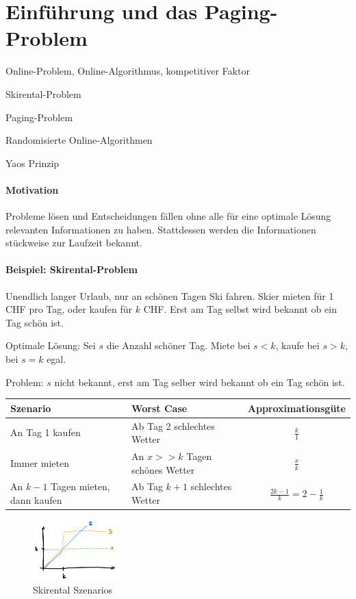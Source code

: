 \section{Einführung und das Paging-Problem}

\begin{takeaway}
    \item Online-Problem, Online-Algorithmus, kompetitiver Faktor
    \item Skirental-Problem
    \item Paging-Problem
    \item Randomisierte Online-Algorithmen
    \item Yaos Prinzip
\end{takeaway}

\paragraph{Motivation}
Probleme lösen und Entscheidungen fällen ohne alle für eine optimale Lösung relevanten Informationen zu haben.
Stattdessen werden die Informationen stückweise zur Laufzeit bekannt.

\paragraph{Beispiel: Skirental-Problem}
Unendlich langer Urlaub, nur an schönen Tagen Ski fahren.
Skier mieten für 1 CHF pro Tag, oder kaufen für $k$ CHF.
Erst am Tag selbst wird bekannt ob ein Tag schön ist.

Optimale Lösung: Sei $s$ die Anzahl schöner Tag.
Miete bei $s < k$, kaufe bei $s > k$, bei $s=k$ egal.

Problem: $s$ nicht bekannt, erst am Tag selber wird bekannt ob ein Tag schön ist.

\begin{table}[h]
    \begin{tabular}{l|l|c}
        Szenario & Worst Case & Approximationsgüte \\ \hline
        An Tag 1 kaufen & Ab Tag 2 schlechtes Wetter & $\frac{k}{1}$ \\
        Immer mieten & An $x >> k$ Tagen schönes Wetter & $\frac{x}{k}$ \\
        An $k-1$ Tagen mieten, dann kaufen & Ab Tag $k+1$ schlechtes Wetter & $\frac{2k-1}{k} = 2-\frac{1}{k}$
    \end{tabular}
\end{table}
\begin{figure}[h]
    \centering
    \includegraphics[width=0.3\textwidth]{images/skirental.png}
    \caption{Skirental Szenarios}
\end{figure}

